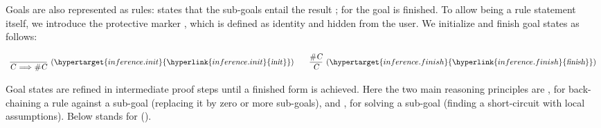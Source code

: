 \begin{isabellebody}
\begin{isamarkuptext}
  \medskip Goals are also represented as rules:  states that the sub-goals  entail the result ; for  the
  goal is finished.  To allow  being a rule statement
  itself, we introduce the protective marker , which is defined as identity and hidden from the user.  We
  initialize and finish goal states as follows:

  \[
  \begin{array}{c@ {\qquad}c}
  \infer[(\indexdef{}{inference}{init}\hypertarget{inference.init}{\hyperlink{inference.init}{\mbox{\isa{init}}}})]{\isa{{\isachardoublequote}C\ {\isasymLongrightarrow}\ {\isacharhash}C{\isachardoublequote}}}{} &
  \infer[(\indexdef{}{inference}{finish}\hypertarget{inference.finish}{\hyperlink{inference.finish}{\mbox{\isa{finish}}}})]{\isa{C}}{\isa{{\isachardoublequote}{\isacharhash}C{\isachardoublequote}}}
  \end{array}
  \]

  \noindent Goal states are refined in intermediate proof steps until
  a finished form is achieved.  Here the two main reasoning principles
  are \hyperlink{inference.resolution}{\mbox{}}, for back-chaining a rule against a
  sub-goal (replacing it by zero or more sub-goals), and \hyperlink{inference.assumption}{\mbox{}}, for solving a sub-goal (finding a short-circuit with
  local assumptions).  Below  stands for  ().


\end{isamarkuptext}
\end{isabellebody}
